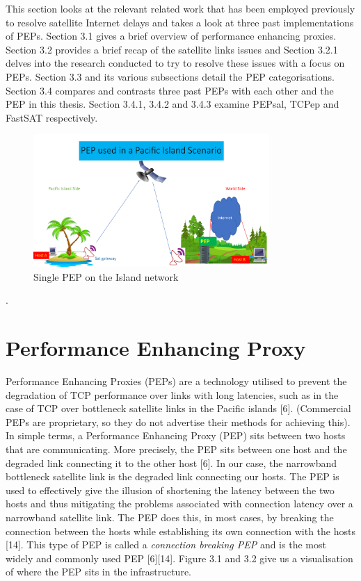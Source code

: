 \documentclass{uathesis}
\begin{document}
This section looks at the relevant related work that has been employed previously to resolve satellite Internet delays and takes a look at three past implementations of PEPs. Section 3.1 gives a brief overview of performance enhancing proxies. Section 3.2 provides a brief recap of the satellite links issues and Section 3.2.1 delves into the research conducted to try to resolve these issues with a focus on PEPs. Section 3.3 and its various subsections detail the PEP categorisations. Section 3.4 compares and contrasts three past PEPs with each other and the PEP in this thesis. Section 3.4.1, 3.4.2 and 3.4.3 examine PEPsal, TCPep and FastSAT respectively.

\begin{figure}[h!]
    \centering
    \includegraphics[width=0.8\textwidth]{PEP.pdf}
    \caption{Single PEP on the Island network}
    \label{fig:PEP}
\end{figure}.

\section{Performance Enhancing Proxy}
Performance Enhancing Proxies (PEPs) are a technology utilised to prevent the degradation of TCP performance over links with long latencies, such as in the case of TCP over bottleneck satellite links in the Pacific islands [6]. (Commercial PEPs are proprietary, so they do not advertise their methods for achieving this). In simple terms, a Performance Enhancing Proxy (PEP) sits between two hosts that are communicating. More precisely, the PEP sits between one host and the degraded link connecting it to the other host [6]. In our case, the narrowband bottleneck satellite link is the degraded link connecting our hosts. The PEP is used to effectively give the illusion of shortening the latency between the two hosts and thus mitigating the problems associated with connection latency over a narrowband satellite link. The PEP does this, in most cases, by breaking the connection between the hosts while establishing its own connection with the hosts [14]. This type of PEP is called a \emph{connection breaking PEP} and is the most widely and commonly used PEP [6][14]. Figure 3.1 and 3.2 give us a visualisation of where the PEP sits in the infrastructure.
\end{document}
